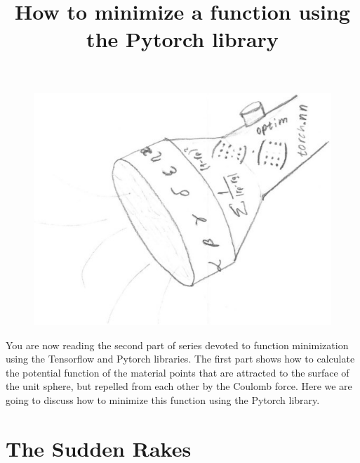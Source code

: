 \documentclass[12pt]{extarticle}
\begin{document}
\title {How to minimize a function using the Pytorch library \date{} }
\maketitle 

\begin{figure}[h]
\centering\includegraphics[width=.5\hsize]{pics/magic_torch.jpeg}
\end{figure}


You are now reading the second part of series devoted to
function minimization using the Tensorflow and Pytorch libraries. 
%
The first part shows how to calculate the potential function
of the material points that are attracted to the surface of the unit
sphere, but repelled from each other by the Coulomb force.
%
Here we are going to discuss how to minimize this function using
the Pytorch library.

\section{The Sudden Rakes}

\lstset{language=Python}
\end{document}
